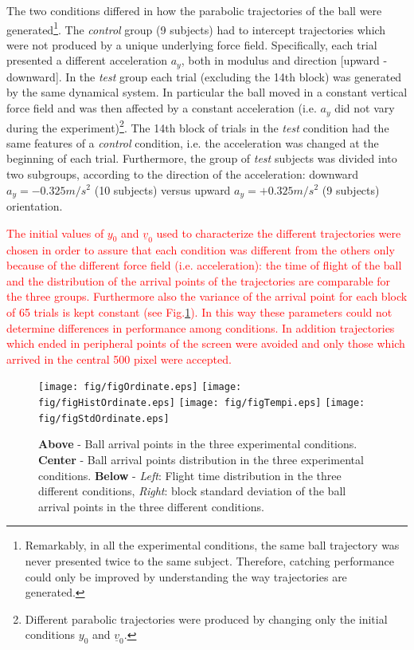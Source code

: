 The two conditions differed in how the parabolic trajectories of the ball were generated\footnote{Remarkably, in all the experimental conditions, the same ball trajectory was never presented twice to the same subject. Therefore, catching performance could only be improved by understanding the way trajectories are generated.}. The \textit{control} group (9 subjects) had to intercept trajectories which were not produced by a unique underlying force field. Specifically, each trial presented a different acceleration $a_y$, both in modulus and direction [upward - downward]. In the \textit{test} group each trial (excluding the 14th block) was generated by the same dynamical system. In particular the ball moved in a constant vertical force field and was then affected by a constant acceleration (i.e. $a_y$ did not vary during the experiment)\footnote{Different parabolic trajectories were produced by changing only the initial conditions $y_0$ and $\underline{v}_0$.}. The 14th block of trials in the \textit{test} condition had the same features of a \textit{control} condition, i.e. the acceleration was changed at the beginning of each trial. Furthermore, the group of \textit{test} subjects was divided into two subgroups, according to the direction of the acceleration: downward $a_y=-0.325 m/{s^2}$ (10 subjects) versus upward $a_y=+0.325 m/{s^2}$ (9 subjects) orientation.

\textcolor{red}{The initial values of $y_0$ and $\underline{v}_0$ used to characterize the different trajectories were chosen in order to assure that each condition was different from the others only because of the different force field (i.e. acceleration): the time of flight of the ball %
and the distribution of the arrival points of the trajectories are comparable for the three groups. Furthermore also the variance of the arrival point for each block of 65 trials is kept constant (see Fig.\ref{figCondInit}). %
In this way these parameters could not determine differences in performance among conditions. In addition trajectories which ended in peripheral points of the screen were avoided and only those which arrived in the central 500 pixel were accepted.}



\begin{figure}[tbp]
	\centering
		\texttt{[image: fig/figOrdinate.eps]}
		\texttt{[image: fig/figHistOrdinate.eps]}
		\texttt{[image: fig/figTempi.eps]}
		\texttt{[image: fig/figStdOrdinate.eps]}
	\caption{\textbf{Above} - Ball arrival points in the three experimental conditions. \textbf{Center} -  Ball arrival points distribution in the three experimental conditions. \textbf{Below} - \textit{Left}: Flight time distribution in the three different conditions, \textit{Right}: block standard deviation of the ball arrival points in the three different conditions.}
	\label{figCondInit}
\end{figure}

